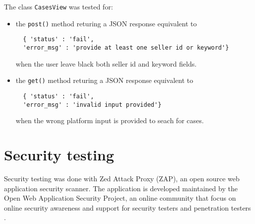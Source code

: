 The class \texttt{CasesView} was tested for:
\begin{itemize}
  \item the \texttt{post()} method returing a JSON response equivalent to
  \begin{verbatim}
  { 'status' : 'fail',
  'error_msg' : 'provide at least one seller id or keyword'} \end{verbatim} when
  the user leave black both seller id and keyword fields.
  \item the \texttt{get()} method returing a JSON response equivalent to
  \begin{verbatim}
  { 'status' : 'fail',
  'error_msg' : 'invalid input provided'} \end{verbatim} when the wrong platform
  input is provided to seach for cases.
\end{itemize}


\section{Security testing}
Security testing was done with Zed Attack Proxy (ZAP), an open source web
application security scanner. The application is developed maintained by the
Open Web Application Security Project, an online community that focus on online
security awareness and support for security testers and penetration testers
\cite{zap}.

